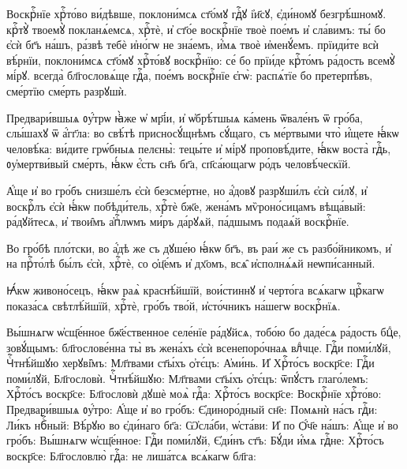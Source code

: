 \hKv Воскрⷭ҇нїе хрⷭ҇то́во ви́дѣвше, поклони́мсѧ ст҃о́мꙋ гдⷭ҇ꙋ  і҆и҃сꙋ, є҆ди́номꙋ безгрѣ́шномꙋ. крⷭ҇тꙋ̀ твоемꙋ̀  покланѧ́емсѧ, хрⷭ҇тѐ, и҆ ст҃о́е воскрⷭ҇нїе твоѐ пое́мъ и҆  сла́вимъ: ты́ бо є҆сѝ бг҃ъ на́шъ, ра́звѣ тебѐ и҆но́гѡ не  зна́емъ, и҆́мѧ твоѐ и҆менꙋ́емъ. прїиди́те всѝ вѣ́рнїи,  поклони́мсѧ ст҃о́мꙋ хрⷭ҇то́вꙋ воскрⷭ҇нїю: се́ бо прїи́де  крⷭ҇то́мъ ра́дость всемꙋ̀ мі́рꙋ. всегда̀ бл҃гословѧ́ще  гдⷭ҇а, пое́мъ воскрⷭ҇нїе є҆гѡ̀: распѧ́тїе бо претерпѣ́въ,  сме́ртїю сме́рть разрꙋшѝ. 
%

\hKv Предвари́вшыѧ ᲂу҆́трѡ ꙗ҆̀же ѡ҆ мр҃і́и, и҆ ѡ҆брѣ́тшыѧ  ка́мень ѿвале́нъ ѿ гро́ба, слы́шахꙋ ѿ а҆́гг҃ла: во  свѣ́тѣ присносꙋ́щнѣмъ сꙋ́щаго, съ ме́ртвыми что̀ и҆́щете  ꙗ҆́кѡ человѣ́ка: ви́дите грѡ́бныѧ пелєны̀: тецы́те и҆  мі́рꙋ проповѣ́дите, ꙗ҆́кѡ воста̀ гдⷭ҇ь,  ᲂу҆мертви́вый сме́рть, ꙗ҆́кѡ є҆́сть сн҃ъ бг҃а,  сп҃са́ющагѡ ро́дъ человѣ́ческїй. 
%

\hKv А҆́ще и҆ во гро́бъ снизше́лъ є҆сѝ безсме́ртне, но а҆́довꙋ  разрꙋши́лъ є҆сѝ си́лꙋ, и҆ воскрⷭ҇лъ є҆сѝ ꙗ҆́кѡ  побѣди́тель, хрⷭ҇тѐ бж҃е, жена́мъ мѷроно́сицамъ  вѣща́вый: ра́дꙋйтесѧ, и҆ твои̑мъ а҆пⷭ҇лѡмъ ми́ръ да́рꙋѧй,  па́дшымъ подаѧ́й воскрⷭ҇нїе. 

\hKv Во гро́бѣ пло́тски, во а҆́дѣ же съ дꙋше́ю ꙗ҆́кѡ бг҃ъ, въ  раи́ же съ разбо́йникомъ, и҆ на прⷭ҇то́лѣ бы́лъ є҆сѝ,  хрⷭ҇тѐ, со ѻ҆ц҃е́мъ и҆ дх҃омъ, всѧ̑ и҆сполнѧ́ѧй  неѡпи́санный. 
%

\hKv Ꙗ҆́кѡ живоно́сецъ, ꙗ҆́кѡ раѧ̀ краснѣ́йшїй,  вои́стиннꙋ и҆ черто́га всѧ́кагѡ црⷭ҇кагѡ показа́сѧ  свѣтлѣ́йшїй, хрⷭ҇тѐ, гро́бъ тво́й, и҆сто́чникъ на́шегѡ  воскрⷭ҇нїѧ. 
%

\hKv Вы́шнѧгѡ ѡ҆сщ҃е́нное бж҃е́ственное селе́нїе  ра́дꙋйсѧ, тобо́ю бо даде́сѧ ра́дость бцⷣе, зовꙋ́щымъ:  бл҃гослове́нна ты̀ въ жена́хъ є҆сѝ всенепоро́чнаѧ влⷣчце.   
%
\hKv Гдⷭ҇и поми́лꙋй,  Чⷭ҇тнѣ́йшꙋю  херꙋві̑мъ:  Мл҃твами ст҃ы́хъ ѻ҆тє́цъ:  А҆ми́нь. 
\hKv И҆ Хрⷭ҇то́съ воскр҃се: 
 Гдⷭ҇и поми́лꙋй,  \hKv Бл҃гословѝ. 
%
%
%
 Чⷭ҇тнѣ́йшꙋю:  Мл҃твами ст҃ы́хъ ѻ҆тє́цъ: 
 ѿпꙋ́стъ глаго́лемъ: Хрⷭ҇то́съ воскр҃се:  
Бл҃гословѝ дꙋшѐ моѧ̀  гдⷭ҇а: 
\hKv Хрⷭ҇то́съ воскр҃се:  Воскрⷭ҇нїе хрⷭ҇то́во:  \hKv Предвари́вшыѧ ᲂу҆́тро: 
 А҆́ще и҆ во  гро́бъ:  Є҆диноро́дный сн҃е:
 Помѧнѝ на́съ  гдⷭ҇и: \hKv Ли́къ нбⷭ҇ный: 
\hKv Вѣ́рꙋю во є҆ди́наго бг҃а: 
\hKv Ѡ҆сла́би,  ѡ҆ста́ви: 
\hKv И҆ по \hKv Ѻ҆́ч҃е на́шъ:  А҆́ще и҆ во гро́бъ:  Вы́шнѧгѡ  ѡ҆сщ҃е́нное: \hKv Гдⷭ҇и поми́лꙋй,
 Є҆ди́нъ ст҃ъ: 
 Бꙋ́ди и҆́мѧ гдⷭ҇не: \hKv Хрⷭ҇то́съ воскр҃се: 
 Бл҃гословлю̀ гдⷭ҇а:  не лиша́тсѧ всѧ́кагѡ  бл҃га:  
